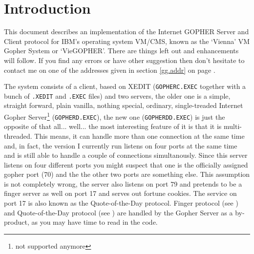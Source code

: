 \newcommand{\SUBsection}[1]{\subsection{#1}}
\newcommand{\SUBsubsection}[1]{\subsubsection{#1}}

\setcounter{page}{1}



\section{Introduction}

This document describes an implementation of the Internet GOPHER Server
and Client protocol for IBM's operating system VM/CMS, known as the
`Vienna' VM Gopher System or `VieGOPHER'.
There are things left out and enhancements will follow.  If you find any
errors or have other suggestion then don't hesitate to contact me on one
of the addresses given in section \ref{gg.addr} on page \pageref{gg.addr}.
 
The system consists of a client, based on {\sf XEDIT} ({\tt GOPHERC.EXEC}
together with
a bunch of {\tt .XEDIT} and {\tt .EXEC} files) and two servers,
the older one is a simple,
straight forward, plain vanilla, nothing special, ordinary, single-treaded
Internet Gopher Server\footnote{not supported anymore} ({\tt GOPHERD.EXEC}),
the new one ({\tt GOPHERDD.EXEC}) %
is just the opposite of that all...  well...  the most interesting feature
of it is that it is multi-threaded.  This means, it can handle more than
one connection at the same time and, in fact, the version I currently run
listens on four ports at the same time and is still able to handle a
couple of connections simultanously.  Since this server listens on four
different ports you might suspect that one is the officially assigned
gopher port (70) and the the other two ports are something else.  This
assumption is not completely wrong, the server also listens on port 79
and pretends to be a finger server as well on port 17 and serves out fortune
cookies.  The service on port 17 is also known as the Quote-of-the-Day
protocol.  Finger protocol (see \cite{rfc1288})
and Quote-of-the-Day protocol (see \cite{rfc865})
are handled by the Gopher Server as a by-product,
as you may have time to read in the code.
 
